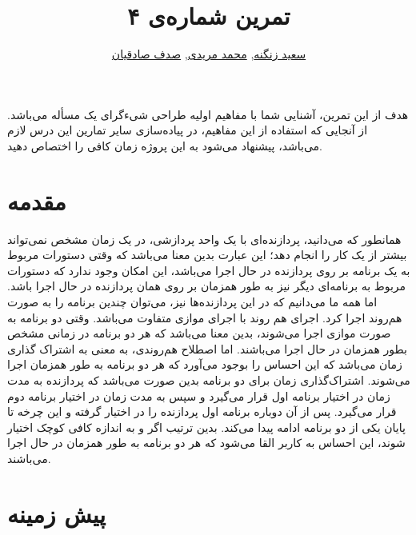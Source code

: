 \documentclass{utap}
\title{تمرین شماره‌ی ۴}
\author{ \href{mailto:zangenehsaeed412@gmail.com?subject=[AP\%20S98 A4]\%20}{سعید زنگنه},
\href{mailto:m.moridi.2009@gmail.com?subject=[AP\%20S98 A4]\%20}{محمد مریدی},
\href{mailto:sadeghian.sadaf22@gmail.com?subject=[AP\%20S98 A4]\%20}{صدف صادقیان}}
\begin{document}
	\maketitle
	
	هدف از این تمرین، آشنایی شما با مفاهیم اولیه طراحی شی‌ءگرای یک مسأله می‌باشد. از آنجایی که استفاده از این مفاهیم، در پیاده‌سازی سایر تمارین این درس لازم می‌باشد، پیشنهاد می‌شود به این پروژه زمان کافی را اختصاص دهید.
	\section{مقدمه}
	
	\hspace{5mm}
همانطور که می‌دانید، پردازنده‌ای با یک واحد پردازشی، در یک زمان مشخص نمی‌تواند بیشتر از یک کار را انجام دهد؛ این عبارت بدین معنا می‌باشد که وقتی دستورات مربوط به یک برنامه بر روی پردازنده در حال اجرا می‌باشد، این امکان وجود ندارد که دستورات مربوط به برنامه‌ای دیگر نیز به طور همزمان بر روی همان پردازنده در حال اجرا باشد. اما همه ما می‌دانیم که در این پردازنده‌ها نیز، می‌توان چندین برنامه را به صورت هم‌روند اجرا کرد. اجرای هم روند با اجرای موازی  متفاوت می‌باشد. وقتی دو برنامه به صورت موازی اجرا می‌شوند، بدین معنا می‌باشد که هر دو برنامه در زمانی مشخص بطور همزمان در حال اجرا می‌باشند. اما اصطلاح هم‌روندی، به معنی به اشتراک گذاری زمان  می‌باشد که این احساس را بوجود می‌آورد که هر دو برنامه به طور همزمان اجرا می‌شوند. اشتراک‌گذاری زمان برای دو برنامه بدین صورت می‌باشد که پردازنده به مدت زمان  در اختیار برنامه اول قرار می‌گیرد و سپس به مدت زمان   در اختیار برنامه دوم قرار می‌گیرد. پس از آن دوباره برنامه اول پردازنده را در اختیار گرفته و این چرخه تا پایان یکی از دو برنامه ادامه پیدا می‌کند. بدین ترتیب اگر   و   به اندازه کافی کوچک اختیار شوند، این احساس به کاربر القا می‌شود که هر دو برنامه به طور همزمان در حال اجرا می‌باشند.
	
	\section{پیش زمینه}
\end{document}
